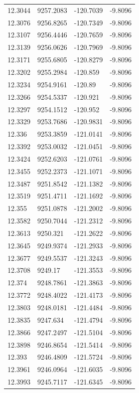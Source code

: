 \begin{table}[H]
\begin{tabular}{llll}
12.3044 & 9257.2083 & -120.7039 & -9.8096 \\
12.3076 & 9256.8265 & -120.7349 & -9.8096 \\
12.3107 & 9256.4446 & -120.7659 & -9.8096 \\
12.3139 & 9256.0626 & -120.7969 & -9.8096 \\
12.3171 & 9255.6805 & -120.8279 & -9.8096 \\
12.3202 & 9255.2984 & -120.859 & -9.8096 \\
12.3234 & 9254.9161 & -120.89 & -9.8096 \\
12.3266 & 9254.5337 & -120.921 & -9.8096 \\
12.3297 & 9254.1512 & -120.952 & -9.8096 \\
12.3329 & 9253.7686 & -120.9831 & -9.8096 \\
12.336 & 9253.3859 & -121.0141 & -9.8096 \\
12.3392 & 9253.0032 & -121.0451 & -9.8096 \\
12.3424 & 9252.6203 & -121.0761 & -9.8096 \\
12.3455 & 9252.2373 & -121.1071 & -9.8096 \\
12.3487 & 9251.8542 & -121.1382 & -9.8096 \\
12.3519 & 9251.4711 & -121.1692 & -9.8096 \\
12.355 & 9251.0878 & -121.2002 & -9.8096 \\
12.3582 & 9250.7044 & -121.2312 & -9.8096 \\
12.3613 & 9250.321 & -121.2622 & -9.8096 \\
12.3645 & 9249.9374 & -121.2933 & -9.8096 \\
12.3677 & 9249.5537 & -121.3243 & -9.8096 \\
12.3708 & 9249.17 & -121.3553 & -9.8096 \\
12.374 & 9248.7861 & -121.3863 & -9.8096 \\
12.3772 & 9248.4022 & -121.4173 & -9.8096 \\
12.3803 & 9248.0181 & -121.4484 & -9.8096 \\
12.3835 & 9247.634 & -121.4794 & -9.8096 \\
12.3866 & 9247.2497 & -121.5104 & -9.8096 \\
12.3898 & 9246.8654 & -121.5414 & -9.8096 \\
12.393 & 9246.4809 & -121.5724 & -9.8096 \\
12.3961 & 9246.0964 & -121.6035 & -9.8096 \\
12.3993 & 9245.7117 & -121.6345 & -9.8096 \\

\end{tabular}
\end{table}
